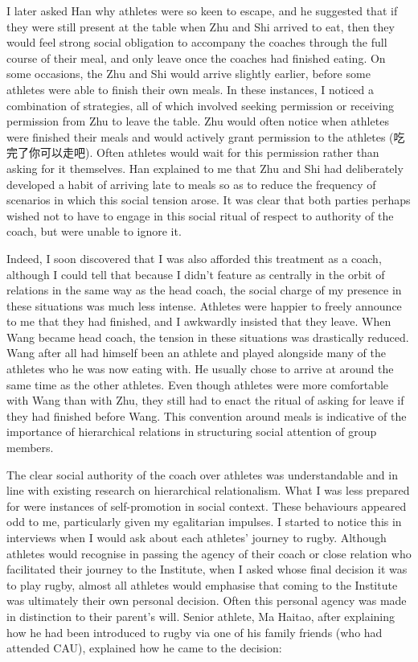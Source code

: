 \begin{CJK}{UTF8}{gbsn}
  I later asked Han why athletes were so keen to escape, and he suggested that if they were still present at the table when Zhu and Shi arrived to eat, then they would feel strong social obligation to accompany the coaches through the full course of their meal, and only leave once the coaches had finished eating.  On some occasions, the Zhu and Shi would arrive slightly earlier, before some athletes were able to finish their own meals.  In these instances, I noticed a combination of strategies, all of which involved seeking permission or receiving permission from Zhu to leave the table.  Zhu would often notice when athletes were finished their meals and would actively grant permission to the athletes (吃完了你可以走吧).  Often athletes would wait for this permission rather than asking for it themselves.  Han explained to me that Zhu and Shi had deliberately developed a habit of arriving late to meals so as to reduce the frequency of scenarios in which this social tension arose.  It was clear that both parties perhaps wished not to have to engage in this social ritual of respect to authority of the coach, but were unable to ignore it.

  Indeed, I soon discovered that I was also afforded this treatment as a coach, although I could tell that because I didn't feature as centrally in the orbit of relations in the same way as the head coach, the social charge of my presence in these situations was much less intense.  Athletes were happier to freely announce to me that they had finished, and I awkwardly insisted that they leave.  When Wang became head coach, the tension in these situations was drastically reduced. Wang after all had himself been an athlete and played alongside many of the athletes who he was now eating with.  He usually chose to arrive at around the same time as the other athletes.  Even though athletes were more comfortable with Wang than with Zhu, they still had to enact the ritual of asking for leave if they had finished before Wang.  This convention around meals is indicative of the importance of hierarchical relations in structuring social attention of group members.

  The clear social authority of the coach over athletes was understandable and in line with existing research on hierarchical relationalism.  What I was less prepared for were instances of self-promotion in social context.  These behaviours appeared odd to me, particularly given my egalitarian impulses.  I started to notice this in interviews when I would ask about each athletes' journey to rugby.  Although athletes would recognise in passing the agency of their coach or close relation who facilitated their journey to the Institute, when I asked whose final decision it was to play rugby, almost all athletes would emphasise that coming to the Institute was ultimately their own personal decision.  Often this personal agency was made in distinction to their parent's will.  Senior athlete, Ma Haitao, after explaining how he had been introduced to rugby via one of his family friends (who had attended CAU), explained how he came to the decision:


\end{CJK}

